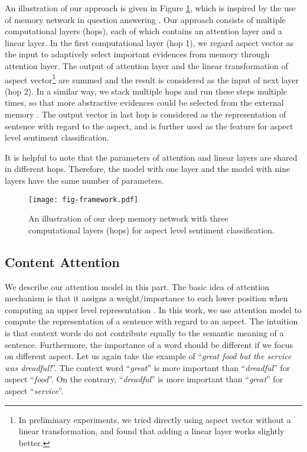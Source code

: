 \documentclass[11pt,letterpaper]{article}
\begin{document}
An illustration of our approach is given in Figure \ref{fig:framework}, which is inspired by the use of memory network in question answering \cite{Sukhbaatar2015end}.
Our approach consists of multiple computational layers (hops), each of which contains an attention layer and a linear layer. 
In the first computational layer (hop 1), we regard aspect vector as the input to adaptively select important evidences from memory  through attention layer. 
The output of attention layer and the linear transformation of aspect vector\footnote{In preliminary experiments, we tried directly using aspect vector without a linear transformation, and found that adding a linear layer works slightly better.} are summed and the result is considered as the input of next layer (hop 2). 
In a similar way, we stack multiple hops and run these steps multiple times, so that more abstractive evidences could be selected from the external memory . 
The output vector in last hop is considered as the representation of sentence with regard to the aspect, and is further used as the feature for aspect level sentiment classification. 

It is helpful to note that the parameters of attention and linear layers are shared in different hops. 
Therefore, the model with one layer and the model with nine layers have the same number of parameters.

\begin{figure}[t]
	\centering
	\texttt{[image: fig-framework.pdf]}
	\caption{An illustration of our deep memory network with three computational layers (hops) for aspect level sentiment classification.}
	\label{fig:framework}
\end{figure}

\subsection{Content Attention}
We describe our attention model in this part.
The basic idea of attention mechanism is that it assigns a weight/importance to each lower position when computing an upper level representation \cite{Bahdanau2015}.
In this work, we use attention model to compute the representation of a sentence with regard to an aspect. 
The intuition is that context words do not contribute equally to the semantic meaning of a sentence. 
Furthermore, the importance of a word should be different if we focus on different aspect.
Let us again take the example of  ``\textit{great food but the service was dreadful!}''. 
The context word ``\textit{great}'' is more important than ``\textit{dreadful}'' for aspect ``\textit{food}''.
On the contrary, ``\textit{dreadful}'' is more important than ``\textit{great}'' for aspect ``\textit{service}''.
\end{document}
